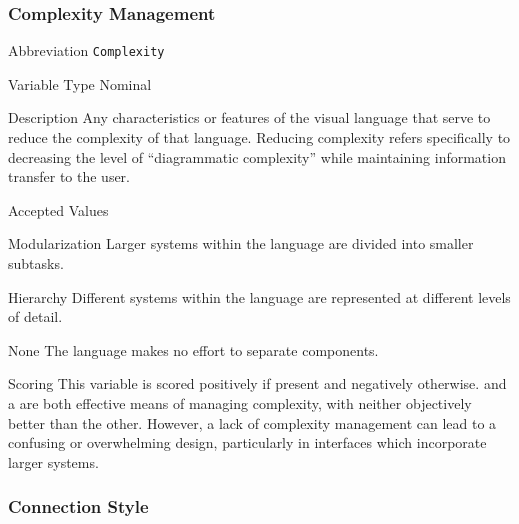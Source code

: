 \subsubsection{Complexity Management}
\label{subsubsec:complexity}

\begin{AlignedDesc}
  \item[Abbreviation] \texttt{Complexity}

  \item[Variable Type] Nominal

  \item[Description] Any characteristics or features of the visual language
  that serve to reduce the complexity of that language. Reducing complexity
  refers specifically to decreasing the level of ``diagrammatic
  complexity'' while maintaining information transfer to the
  user.~\cite{moody2009}

  \item[Accepted Values]

  \begin{AlignedDesc}
    \item[Modularization] Larger systems within the language are divided
    into smaller subtasks.~\cite{moody2009}
    \item[Hierarchy] Different systems within the language are represented
    at different levels of detail.~\cite{moody2009}
    \item[None] The language makes no effort to separate components.
  \end{AlignedDesc}

  \item[Scoring] This variable is scored positively if present and
  negatively otherwise.   and a  are both effective means of managing complexity, with neither
  objectively better than the other. However, a lack of complexity
  management can lead to a confusing or overwhelming design, particularly
  in interfaces which incorporate larger systems.

\end{AlignedDesc}

\subsubsection{Connection Style}
\label{subsubsec:connection}

